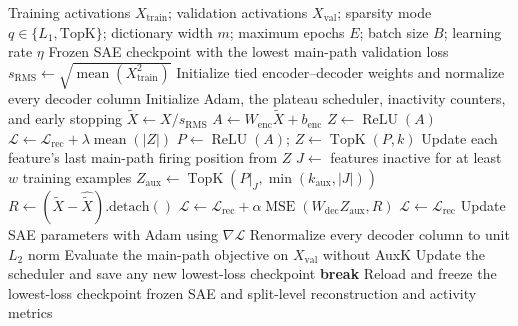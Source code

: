 \begin{algorithm}[H]
\caption{Custom L1 or TopK--AuxK SAE training}
\label{alg:custom-sae-training}
\begin{algorithmic}[1]
\Require Training activations $X_{\mathrm{train}}$; validation activations $X_{\mathrm{val}}$;
sparsity mode $q\in\{L_1,\mathrm{TopK}\}$; dictionary width $m$; maximum epochs $E$;
batch size $B$; learning rate $\eta$
\Ensure Frozen SAE checkpoint with the lowest main-path validation loss
\State $s_{\mathrm{RMS}}\gets\sqrt{\operatorname{mean}(X_{\mathrm{train}}^2)}$
\State Initialize tied encoder--decoder weights and normalize every decoder column
\State Initialize Adam, the plateau scheduler, inactivity counters, and early stopping
        \State $\widetilde{X}\gets X/s_{\mathrm{RMS}}$
        \State $A\gets W_{\mathrm{enc}}\widetilde{X}+b_{\mathrm{enc}}$
            \State $Z\gets\operatorname{ReLU}(A)$
            \State $\mathcal{L}\gets\mathcal{L}_{\mathrm{rec}}+\lambda\operatorname{mean}(|Z|)$
        \Else
            \State $P\gets\operatorname{ReLU}(A)$; $Z\gets\operatorname{TopK}(P,k)$
            \State Update each feature's last main-path firing position from $Z$
            \State $J\gets$ features inactive for at least $w$ training examples
                \State $Z_{\mathrm{aux}}\gets
                \operatorname{TopK}(P|_J,\min(k_{\mathrm{aux}},|J|))$
                \State $R\gets(\widetilde{X}-\widehat{\widetilde{X}})\text{.detach}()$
                \State $\mathcal{L}\gets\mathcal{L}_{\mathrm{rec}}+
                \alpha\operatorname{MSE}(W_{\mathrm{dec}}Z_{\mathrm{aux}},R)$
            \Else
                \State $\mathcal{L}\gets\mathcal{L}_{\mathrm{rec}}$
            \EndIf
        \EndIf
        \State Update SAE parameters with Adam using $\nabla\mathcal{L}$
        \State Renormalize every decoder column to unit $L_2$ norm
    \EndFor
    \State Evaluate the main-path objective on $X_{\mathrm{val}}$ without AuxK
    \State Update the scheduler and save any new lowest-loss checkpoint
        \State \textbf{break}
    \EndIf
\EndFor
\State Reload and freeze the lowest-loss checkpoint
\State \Return frozen SAE and split-level reconstruction and activity metrics
\end{algorithmic}
\end{algorithm}
